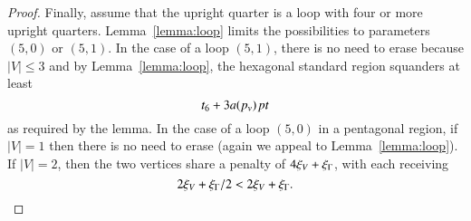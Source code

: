 \begin{proof}
Finally, assume that the upright quarter is a loop with four or
more upright quarters.  Lemma~\ref{lemma:loop} limits the
possibilities to parameters $(5,0)$ or $(5,1)$.  In the case of a
loop $(5,1)$, there is no need to erase because $|V|\le3$ and by
Lemma~\ref{lemma:loop}, the hexagonal standard region squanders at
least
   $$t_6 + 3 a(p_v)\,\hbox{\it pt}$$
as required by the lemma.  In the case of a loop $(5,0)$ in a
pentagonal region, if $|V|=1$ then there is no need to erase
(again we appeal to Lemma~\ref{lemma:loop}).  If $|V| =2$, then
the two vertices share a penalty of $4\xi_V + \xi_\Gamma$, with each
receiving
   $$2\xi_V + \xi_\Gamma/2 < 2\xi_V +\xi_\Gamma.$$
\end{proof}











